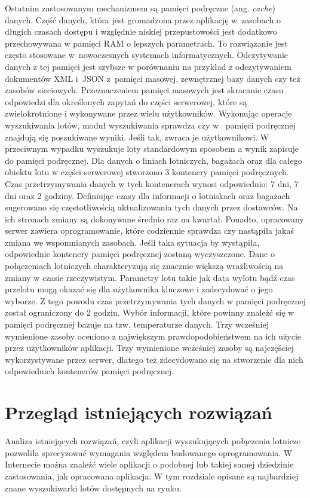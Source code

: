 \documentclass[12pt, twoside]{report}
\begin{document}
Ostatnim zastosowanym mechanizmem są pamięci podręczne (ang. \emph{cache}) danych. Część danych, która jest gromadzona przez aplikację w~zasobach o długich czasach dostępu i względnie niskiej przepustowości jest dodatkowo przechowywana w pamięci RAM o lepszych parametrach\cite{ehcache}. To rozwiązanie jest często stosowane w~nowoczesnych systemach informatycznych. Odczytywanie danych z tej pamięci jest szybsze w porównaniu na przykład z odczytywaniem dokumentów XML i~JSON z~pamięci masowej, zewnętrznej bazy danych czy też zasobów sieciowych. Przeznaczeniem pamięci masowych jest skracanie czasu odpowiedzi dla określonych zapytań do części serwerowej, które są zwielokrotnione i wykonywane przez wielu użytkowników. Wykonując operacje wyszukiwania lotów, moduł wyszukiwania sprawdza czy w  ~pamięci podręcznej znajdują się poszukiwane wyniki. Jeśli tak, zwraca je użytkownikowi. W przeciwnym wypadku  wyszukuje loty standardowym sposobem a wynik zapisuje do pamięci podręcznej. Dla danych o liniach lotniczych, bagażach oraz dla całego obiektu lotu w części serwerowej stworzono 3 kontenery pamięci podręcznych. Czas przetrzymywania danych w tych kontenerach wynosi odpowiednio: 7 dni, 7 dni oraz 2 godziny. Definiując czasy dla informacji o lotniskach oraz bagażach sugerowano się częstotliwością aktualizowania tych danych przez dostawców. Na ich stronach zmiany są dokonywane średnio raz na kwartał. Ponadto, opracowany serwer zawiera oprogramowanie, które codziennie sprawdza czy nastąpiła jakaś zmiana we wspomnianych zasobach. Jeśli taka sytuacja by wystąpiła, odpowiednie kontenery pamięci podręcznej zostaną wyczyszczone. Dane o połączeniach lotniczych charakteryzują się znacznie większą wrażliwością na zmiany w czasie rzeczywistym. Parametry lotu takie jak data wylotu bądź czas przelotu mogą okazać się dla użytkownika kluczowe i zadecydować o jego wyborze. Z tego powodu czas przetrzymywania tych danych w pamięci podręcznej został ograniczony do 2 godzin. 
Wybór informacji, które powinny znaleźć się w pamięci podręcznej bazuje na tzw. temperaturze danych. Trzy wcześniej wymienione zasoby oceniono z największym prawdopodobieństwem na ich użycie przez użytkowników aplikacji. 
Trzy wymienione wcześniej zasoby są najczęściej wykorzystywane przez serwer, dlatego też zdecydowano się na stworzenie dla nich odpowiednich kontenerów pamięci podręcznej.

\chapter{Przegląd istniejących rozwiązań}
Analiza istniejących rozwiązań, czyli aplikacji wyszukujących połączenia lotnicze pozwoliła sprecyzować wymagania względem budowanego oprogramowania. W Internecie można znaleźć wiele aplikacji o podobnej lub takiej samej dziedzinie zastosowania, jak opracowana aplikacja. W tym rozdziale opisane są najbardziej znane wyszukiwarki lotów dostępnych na rynku. 
\end{document}
